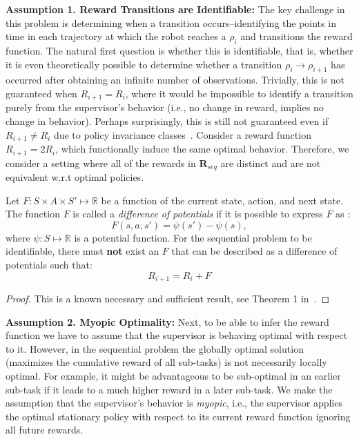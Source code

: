 \vspace{0.5em}\noindent\textbf{Assumption 1. Reward Transitions are Identifiable: } The key challenge in this problem is determining when a transition occurs--identifying the points in time in each trajectory at which the robot reaches a $\rho_i$ and transitions the reward function. The natural first question is whether this is identifiable, that is, whether it is even theoretically possible to determine whether a transition $\rho_i \rightarrow \rho_{i+1}$ has occurred after obtaining an infinite number of observations. Trivially, this is not guaranteed when $R_{i+1} = R_{i}$, where it would be impossible to identify a transition purely from the supervisor's behavior (i.e., no change in reward, implies no change in behavior). Perhaps surprisingly, this is still not guaranteed even if $R_{i+1} \ne R_{i}$ due to policy invariance classes~\cite{DBLP:conf/icml/NgHR99}. Consider a reward function $R_{i+1} = 2R_{i}$, which functionally induce the same optimal behavior. Therefore, we consider a setting where all of the rewards in $\mathbf{R}_{seq}$ are distinct and are not equivalent w.r.t optimal policies.

\begin{proposition}
Let $F: S \times A \times S' \mapsto \mathbb{R}$ be a function of the current state, action, and next state. The function $F$ is called a \emph{difference of potentials} if it is possible to express $F$ as :
\[
F(s,a,s') = \psi(s') - \psi(s),
\]
where $\psi: S \mapsto \mathbb{R}$ is a potential function.
For the sequential problem to be identifiable, there must \textbf{not} exist an $F$ that can be described as a difference of potentials such that: 
\[ 
R_{i+1} = R_{i} + F
\]
\end{proposition}
\begin{proof}
This is a known necessary and sufficient result, see Theorem 1 in~\cite{DBLP:conf/icml/NgHR99}.
\end{proof}


\vspace{0.5em}\noindent\textbf{Assumption 2. Myopic Optimality: } Next, to be able to infer the reward function we have to assume that the supervisor is behaving optimal with respect to it. However, in the sequential problem the globally optimal solution (maximizes the cumulative reward of all sub-tasks) is not necessarily locally optimal. For example, it might be advantageous to be sub-optimal in an earlier sub-task if it leads to a much higher reward in a later sub-task. We make the assumption that the supervisor's behavior is \emph{myopic}, i.e., the supervisor applies the optimal stationary policy with respect to its current reward function ignoring all future rewards. 


